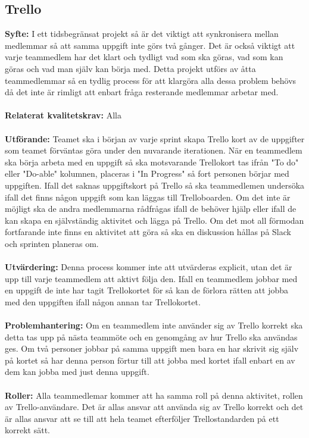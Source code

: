 \documentclass[10pt]{article}
\begin{document}
	\subsection{Trello}
	\textbf{Syfte:}	I ett tidsbegränsat projekt så är det viktigt att synkronisera mellan medlemmar så att samma uppgift inte görs två gånger. Det är också viktigt att varje teammedlem har det klart och tydligt vad som ska göras, vad som kan göras och vad man själv kan börja med. Detta projekt utförs av åtta teammedlemmar så en tydlig process för att klargöra alla dessa problem behövs då det inte är rimligt att enbart fråga resterande medlemmar arbetar med.
	\\\\
	\textbf{Relaterat kvalitetskrav:} Alla
	\\\\
	\textbf{Utförande:} Teamet ska i början av varje sprint skapa Trello kort av de uppgifter som teamet förväntas göra under den nuvarande iterationen. När en teammedlem ska börja arbeta med en uppgift så ska motsvarande Trellokort tas ifrån "To do" eller "Do-able" kolumnen, placeras i "In Progress" så fort personen börjar med uppgiften. Ifall det saknas uppgiftskort på Trello så ska teammedlemen undersöka ifall det finns någon uppgift som kan läggas till Trelloboarden. Om det inte är möjligt ska de andra medlemmarna rådfrågas ifall de behöver hjälp eller ifall de kan skapa en självständig aktivitet och lägga på Trello. Om det mot all förmodan fortfarande inte finns en aktivitet att göra så ska en diskussion hållas på Slack och sprinten planeras om.
	\\\\
	\textbf{Utvärdering:} Denna process kommer inte att utvärderas explicit, utan det är upp till varje teammedlem att aktivt följa den. Ifall en teammedlem jobbar med en uppgift de inte har tagit Trellokortet för så kan de förlora rätten att jobba med den uppgiften ifall någon annan tar Trellokortet.
	\\\\
	\textbf{Problemhantering:} Om en teammedlem inte använder sig av Trello korrekt ska detta tas upp på nästa teammöte och en genomgång av hur Trello ska användas ges. Om två personer jobbar på samma uppgift men bara en har skrivit sig själv på kortet så har denna person förtur till att jobba med kortet ifall enbart en av dem kan jobba med just denna uppgift.
	\\\\
	\textbf{Roller:} Alla teammedlemar kommer att ha samma roll på denna aktivitet, rollen av Trello-användare. Det är allas ansvar att använda sig av Trello korrekt och det är allas ansvar att se till att hela teamet efterföljer Trellostandarden på ett korrekt sätt.
	
\end{document}
